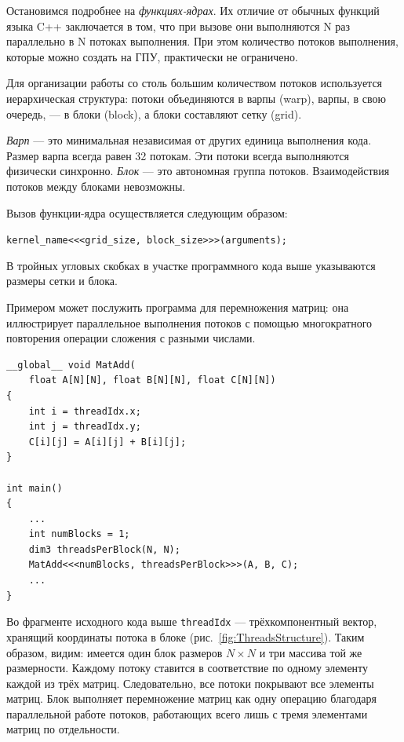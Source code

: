 Остановимся подробнее на \textit{функциях-ядрах}. Их отличие от обычных
функций языка C++ заключается в том, что при вызове они выполняются N раз
параллельно в N потоках выполнения. При этом количество потоков выполнения, которые можно создать на ГПУ, практически не ограничено.

Для организации работы со столь большим количеством потоков используется иерархическая структура: потоки объединяются в варпы (warp), варпы, в
свою очередь, --- в блоки (block), а блоки составляют сетку (grid).

\textit{Варп} --- это минимальная независимая от других единица выполнения кода. Размер варпа всегда равен 32 потокам. Эти потоки всегда выполняются физически синхронно. \textit{Блок} --- это автономная группа потоков. Взаимодействия
потоков между блоками невозможны.


Вызов функции-ядра осуществляется следующим образом:

\texttt{kernel\_name<{<}<grid\_size, block\_size>{>}>(arguments);}

В тройных угловых скобках в участке программного кода выше указываются размеры сетки и блока.

Примером может послужить программа для перемножения матриц: она
иллюстрирует параллельное выполнения потоков с помощью многократного
повторения операции сложения с разными числами.

\begin{lstlisting}
__global__ void MatAdd(
	float A[N][N], float B[N][N], float C[N][N])
{
	int i = threadIdx.x;
	int j = threadIdx.y;
	C[i][j] = A[i][j] + B[i][j];
}

int main()
{
	...
	int numBlocks = 1;
	dim3 threadsPerBlock(N, N);
	MatAdd<<<numBlocks, threadsPerBlock>>>(A, B, C);
	...
}
\end{lstlisting}

Во фрагменте исходного кода выше \texttt{threadIdx} --- трёхкомпонентный вектор, хранящий координаты потока в блоке (рис.~\ref{fig:ThreadsStructure}). Таким образом, видим: имеется один блок размеров $ N \times N $ и три массива той же размерности. Каждому потоку ставится в соответствие по одному элементу каждой из трёх матриц. Следовательно, все потоки покрывают все элементы матриц. Блок выполняет перемножение матриц как одну операцию благодаря параллельной работе потоков, работающих всего лишь с тремя элементами матриц по отдельности.

